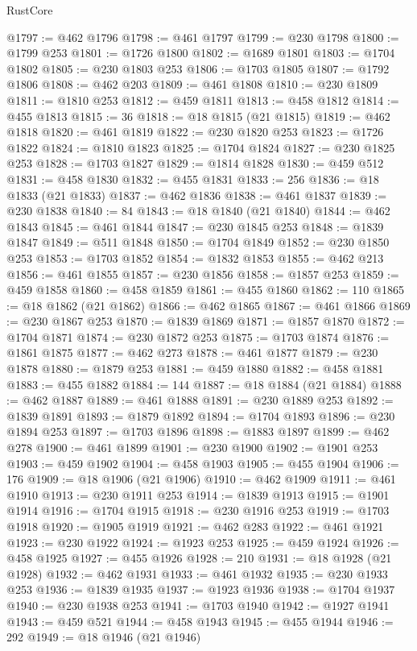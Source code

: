 \begin{lexlean}{RustCore}
\begin{coremodule}
@1797 := @462 @1796
@1798 := @461 @1797
@1799 := @230 @1798
@1800 := @1799 @253
@1801 := @1726 @1800
@1802 := @1689 @1801
@1803 := @1704 @1802
@1805 := @230 @1803 @253
@1806 := @1703 @1805
@1807 := @1792 @1806
@1808 := @462 @203
@1809 := @461 @1808
@1810 := @230 @1809
@1811 := @1810 @253
@1812 := @459 @1811
@1813 := @458 @1812
@1814 := @455 @1813
@1815 := 36
@1818 := @18 @1815 (@21 @1815)
@1819 := @462 @1818
@1820 := @461 @1819
@1822 := @230 @1820 @253
@1823 := @1726 @1822
@1824 := @1810 @1823
@1825 := @1704 @1824
@1827 := @230 @1825 @253
@1828 := @1703 @1827
@1829 := @1814 @1828
@1830 := @459 @512
@1831 := @458 @1830
@1832 := @455 @1831
@1833 := 256
@1836 := @18 @1833 (@21 @1833)
@1837 := @462 @1836
@1838 := @461 @1837
@1839 := @230 @1838
@1840 := 84
@1843 := @18 @1840 (@21 @1840)
@1844 := @462 @1843
@1845 := @461 @1844
@1847 := @230 @1845 @253
@1848 := @1839 @1847
@1849 := @511 @1848
@1850 := @1704 @1849
@1852 := @230 @1850 @253
@1853 := @1703 @1852
@1854 := @1832 @1853
@1855 := @462 @213
@1856 := @461 @1855
@1857 := @230 @1856
@1858 := @1857 @253
@1859 := @459 @1858
@1860 := @458 @1859
@1861 := @455 @1860
@1862 := 110
@1865 := @18 @1862 (@21 @1862)
@1866 := @462 @1865
@1867 := @461 @1866
@1869 := @230 @1867 @253
@1870 := @1839 @1869
@1871 := @1857 @1870
@1872 := @1704 @1871
@1874 := @230 @1872 @253
@1875 := @1703 @1874
@1876 := @1861 @1875
@1877 := @462 @273
@1878 := @461 @1877
@1879 := @230 @1878
@1880 := @1879 @253
@1881 := @459 @1880
@1882 := @458 @1881
@1883 := @455 @1882
@1884 := 144
@1887 := @18 @1884 (@21 @1884)
@1888 := @462 @1887
@1889 := @461 @1888
@1891 := @230 @1889 @253
@1892 := @1839 @1891
@1893 := @1879 @1892
@1894 := @1704 @1893
@1896 := @230 @1894 @253
@1897 := @1703 @1896
@1898 := @1883 @1897
@1899 := @462 @278
@1900 := @461 @1899
@1901 := @230 @1900
@1902 := @1901 @253
@1903 := @459 @1902
@1904 := @458 @1903
@1905 := @455 @1904
@1906 := 176
@1909 := @18 @1906 (@21 @1906)
@1910 := @462 @1909
@1911 := @461 @1910
@1913 := @230 @1911 @253
@1914 := @1839 @1913
@1915 := @1901 @1914
@1916 := @1704 @1915
@1918 := @230 @1916 @253
@1919 := @1703 @1918
@1920 := @1905 @1919
@1921 := @462 @283
@1922 := @461 @1921
@1923 := @230 @1922
@1924 := @1923 @253
@1925 := @459 @1924
@1926 := @458 @1925
@1927 := @455 @1926
@1928 := 210
@1931 := @18 @1928 (@21 @1928)
@1932 := @462 @1931
@1933 := @461 @1932
@1935 := @230 @1933 @253
@1936 := @1839 @1935
@1937 := @1923 @1936
@1938 := @1704 @1937
@1940 := @230 @1938 @253
@1941 := @1703 @1940
@1942 := @1927 @1941
@1943 := @459 @521
@1944 := @458 @1943
@1945 := @455 @1944
@1946 := 292
@1949 := @18 @1946 (@21 @1946)

\end{coremodule}
\end{lexlean}
